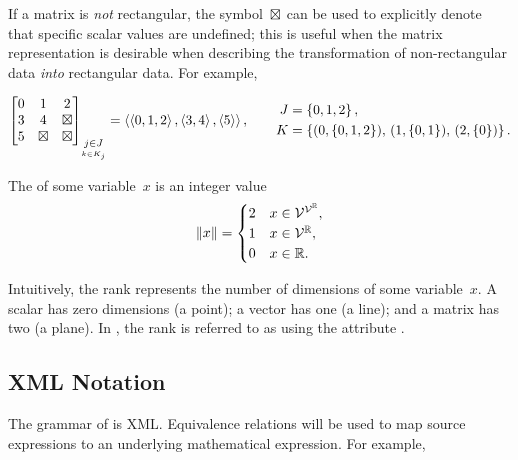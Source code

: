 \indexsym{}
If a matrix is \emph{not} rectangular,
  the symbol~$\boxtimes$ can be used to explicitly denote that specific scalar
    values are undefined;
    this is useful when the matrix representation is desirable when
      describing the transformation of non-rectangular data \emph{into}
      rectangular data.
For example,

\begin{equation}
  \begin{bmatrix}
    0 & 1 & 2 \\
    3 & 4 & \boxtimes \\
    5 & \boxtimes & \boxtimes
  \end{bmatrix}_{\underset{k\in K_j}{j\in J}}
  =
  \left\langle\left\langle0,1,2\right\rangle,\left\langle3,4\right\rangle,\left\langle5\right\rangle\right\rangle,
  \qquad
  \begin{aligned}
    J &= \left\{0,1,2\right\}, \\
    K &= \left\{(0,\left\{0,1,2\right\}),\,
              (1,\left\{0,1\right\}),\,
              (2,\left\{0\right\})\right\}.
  \end{aligned}
\end{equation}


\begin{definition}[Rank]
  The  of some variable~$x$ is an integer value
  \begin{equation*}
    \left\|x\right\| =
      \begin{cases}
        2 &x\in\mathcal{V}^{\mathcal{V}^{\mathbb{R}}}, \\
        1 &x\in\mathcal{V}^{\mathbb{R}}, \\
        0 &x\in\mathbb{R}.
      \end{cases}
  \end{equation*}
\end{definition}

Intuitively, the rank represents the number of dimensions of some variable~$x$.
A scalar has zero dimensions (a point);
  a vector has one (a line);
  and a matrix has two (a plane).
In \tame{},
  the rank is referred to as  using the attribute
  .


\subsection{XML Notation}
The grammar of \tame{} is XML.
Equivalence relations will be used to map source expressions to an
  underlying mathematical expression.
For example,

